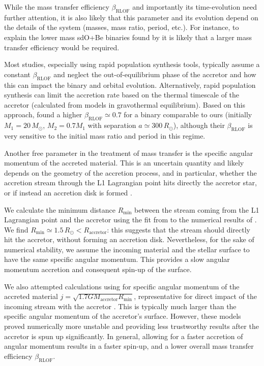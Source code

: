 \documentclass[twocolumn,twocolappendix,trackchanges]{aastex63}
\begin{document}
While the mass transfer efficiency $\beta_\mathrm{RLOF}$ and
importantly its time-evolution need further attention, it is also
likely that this parameter and its evolution depend on the details of
the system (masses, mass ratio, period, etc.). For instance, to
explain the lower mass sdO+Be binaries found by \cite{wang:21_sdOBe} it is likely
that a larger mass transfer efficiency would be required.


Most studies, especially using rapid population synthesis tools,
typically assume a constant $\beta_\mathrm{RLOF}$ and neglect
the out-of-equilibrium phase of the accretor and how this can impact
the binary and orbital evolution. Alternatively, rapid population
synthesis can limit the accretion rate based on the thermal timescale
of the accretor (calculated from models in gravothermal
equilibrium). Based on this approach, \cite{schneider:15} found a
higher $\beta_\mathrm{RLOF}\simeq 0.7$ for a binary comparable to ours
(initially $M_1=20\,M_\odot$, $M_2=0.7M_1$ with separation
$a\simeq300\,R_\odot$), although their $\beta_\mathrm{RLOF}$ is very
sensitive to the initial mass ratio and period in this regime.

Another free parameter in the treatment of mass transfer is the
specific angular momentum of the accreted material. This is an
uncertain quantity and likely depends on the geometry of the accretion
process, and in particular, whether the accretion stream through the
L1 Lagrangian point hits directly the accretor star, or if
instead an accretion disk is formed \citep[e.g.,][]{demink:13}.

We calculate the minimum distance $R_\mathrm{min}$ between the stream
coming from the L1 Lagrangian point and the accretor using the fit
from \cite{ulrich:76} to the numerical results of \cite{lubow:75}. We
find $R_\mathrm{min}\simeq 1.5\,R_\odot < R_\mathrm{accretor}$: this
suggests that the stream should directly hit the accretor, without
forming an accretion disk. Nevertheless, for the sake of numerical
stability, we assume the incoming material and the stellar surface to
have the same specific angular momentum. This provides a slow angular
momentum accretion and consequent spin-up of the surface.

We also attempted calculations using for specific angular momentum of
the accreted material
$j=\sqrt{1.7GM_\mathrm{accretor}R_\mathrm{min}}$, representative for
direct impact of the incoming stream with the accretor
\citep{lubow:75}. This is typically much larger than the specific
angular momentum of the accretor's surface. However, these models
proved numerically more unstable and providing less trustworthy
results after the accretor is spun up significantly. In general,
allowing for a faster accretion of angular momentum results in a
faster spin-up, and a lower overall mass transfer efficiency
$\beta_\mathrm{RLOF}$.
\end{document}
